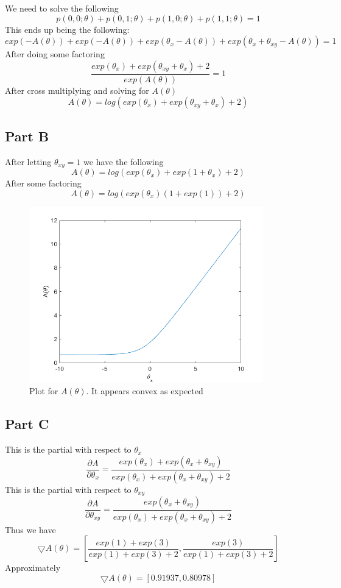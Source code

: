 \documentclass[twoside,11pt]{article}
\theoremstyle{definition}
\begin{document}
We need to solve the following
\[
p(0,0;\theta) + p(0,1;\theta) + p(1,0;\theta) + p(1,1;\theta) = 1
\]
This ends up being the following:
\[
exp(-A(\theta)) + exp(-A(\theta)) + exp(\theta_x - A(\theta)) + exp(\theta_x + \theta_{xy} - A(\theta)) = 1
\]
After doing some factoring
\[
\frac{exp(\theta_x) + exp(\theta_{xy} + \theta_x) + 2}{exp(A(\theta))} = 1
\]
After cross multiplying and solving for $A(\theta)$
\[
A(\theta) = log( exp(\theta_x) + exp(\theta_{xy} + \theta_x) + 2 )
\]

\subsection*{Part B}
After letting $\theta_{xy} = 1$ we have the following
\[
A(\theta) = log( exp(\theta_x) + exp(1 + \theta_x) + 2 )
\]
After some factoring
\[
A(\theta) = log( exp(\theta_x)(1 + exp(1) ) + 2 )
\]
\begin{figure}[h]
\centering
\includegraphics[width=4in]{prob3bplot.png}
\caption{Plot for $A(\theta)$. It appears convex as expected}
\end{figure}

\subsection*{Part C}
This is the partial with respect to $\theta_x$
\[
\frac{\partial A}{\partial \theta_x} = \frac{exp(\theta_x) + exp(\theta_x + \theta_{xy})}{exp(\theta_x) + exp(\theta_x + \theta_{xy}) + 2}
\]
This is the partial with respect to $\theta_{xy}$
\[
\frac{\partial A}{\partial \theta_{xy}} = \frac{exp(\theta_x + \theta_{xy})}{exp(\theta_x) + exp(\theta_x + \theta_{xy}) + 2}
\]
Thus we have 
\[
\bigtriangledown A(\theta) = [\frac{exp(1)+exp(3)}{exp(1)+exp(3)+2},\frac{exp(3)}{exp(1)+exp(3)+2}]
\]
Approximately 
\[
\bigtriangledown A(\theta) = [0.91937,0.80978]
\]
\end{document}
